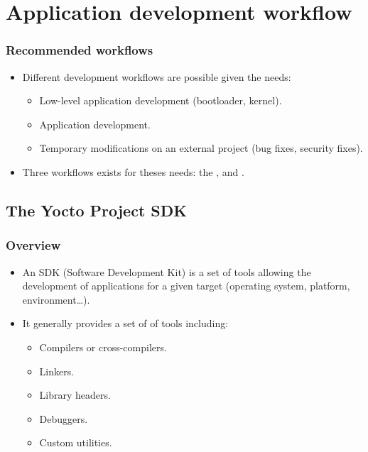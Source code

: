 \section{Application development workflow}

\begin{frame}
  \frametitle{Recommended workflows}
  \begin{itemize}
    \item Different development workflows are possible given the
      needs:
      \begin{itemize}
        \item Low-level application development (bootloader, kernel).
        \item Application development.
        \item Temporary modifications on an external project (bug
          fixes, security fixes).
      \end{itemize}
    \item Three workflows exists for theses needs: the ,
       and .
  \end{itemize}
\end{frame}

\subsection{The Yocto Project SDK}

\begin{frame}
  \frametitle{Overview}
  \begin{itemize}
    \item An SDK (Software Development Kit) is a set of tools allowing
      the development of applications for a given target (operating
      system, platform, environment\dots).
    \item It generally provides a set of of tools including:
      \begin{itemize}
        \item Compilers or cross-compilers.
        \item Linkers.
        \item Library headers.
        \item Debuggers.
        \item Custom utilities.
      \end{itemize}
  \end{itemize}
\end{frame}

